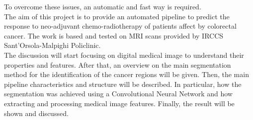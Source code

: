 \documentclass{standalone}
\begin{document}
To overcome these issues, an automatic and fast way is required.\\
The aim of this project is to provide an automated pipeline to predict the response to neo-adjuvant chemo-radiotherapy of patients affect by colorectal cancer. 
The work is based and tested on MRI scans provided by IRCCS Sant’Orsola-Malpighi Policlinic.\\
The discussion will start focusing on digital medical image to understand their properties and features.
After that, an overview on the main segmentation method for the identification of the cancer regions will be given.
Then, the main pipeline characteristics and structure will be described.
In particular, how the segmentation was achieved using a Convolutional Neural Network and how extracting and processing medical image features.
Finally, the result will be shown and discussed.
\end{document}
